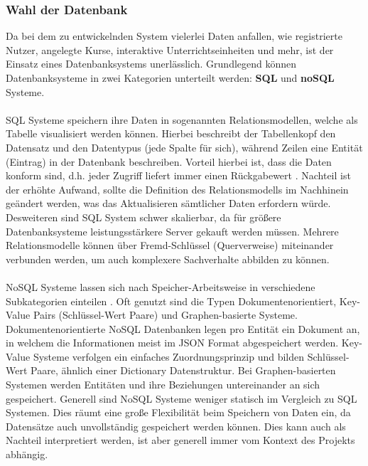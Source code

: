 \subsubsection{Wahl der Datenbank}\label{sec:datenbank}
Da bei dem zu entwickelnden System vielerlei Daten anfallen, wie registrierte Nutzer, angelegte Kurse, interaktive Unterrichtseinheiten und mehr, ist der Einsatz eines Datenbanksystems unerlässlich. Grundlegend können Datenbanksysteme in zwei Kategorien unterteilt werden: 
\textbf{SQL} und \textbf{noSQL} Systeme. \\ \\ SQL Systeme speichern ihre Daten in sogenannten Relationsmodellen, welche als Tabelle visualisiert werden können. Hierbei beschreibt der Tabellenkopf den Datensatz und den Datentypus (jede Spalte für sich), während Zeilen eine Entität (Eintrag) in der Datenbank beschreiben. Vorteil hierbei ist, dass die Daten konform sind, d.h. jeder Zugriff liefert immer einen Rückgabewert \cite{neumann2015entwicklung}. Nachteil ist der erhöhte Aufwand, sollte die Definition des Relationsmodells im Nachhinein geändert werden, was das Aktualisieren sämtlicher Daten erfordern würde. Desweiteren sind SQL System schwer skalierbar, da für größere Datenbanksysteme leistungsstärkere Server gekauft werden müssen. Mehrere Relationsmodelle können über Fremd-Schlüssel (Querverweise) miteinander verbunden werden, um auch komplexere Sachverhalte abbilden zu können. \\ \\ NoSQL Systeme lassen sich nach Speicher-Arbeitsweise in verschiedene Subkategorien einteilen \cite{neumann2015entwicklung}. Oft genutzt sind die Typen Dokumentenorientiert, Key-Value Pairs (Schlüssel-Wert Paare) und Graphen-basierte Systeme. Dokumentenorientierte NoSQL Datenbanken legen pro Entität ein Dokument an, in welchem die Informationen meist im JSON Format abgespeichert werden. Key-Value Systeme verfolgen ein einfaches Zuordnungsprinzip und bilden Schlüssel-Wert Paare, ähnlich einer Dictionary Datenstruktur. Bei Graphen-basierten Systemen werden Entitäten und ihre Beziehungen untereinander an sich gespeichert. Generell sind NoSQL Systeme weniger statisch im Vergleich zu SQL Systemen. Dies räumt eine große Flexibilität beim Speichern von Daten ein, da Datensätze auch unvollständig gespeichert werden können. Dies kann auch als Nachteil interpretiert werden, ist aber generell immer vom Kontext des Projekts abhängig. \\ \\    

